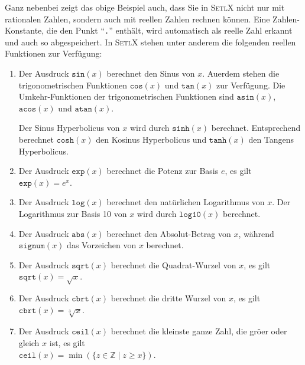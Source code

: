 Ganz nebenbei zeigt das obige Beispiel auch, dass Sie in \textsc{SetlX} nicht
nur mit rationalen Zahlen, sondern auch mit reellen Zahlen rechnen k\"{o}nnen.  Eine Zahlen-Konstante,
die den Punkt ``\texttt{.}'' enth\"{a}lt, wird automatisch als reelle Zahl erkannt
und auch so abgespeichert.  In \textsc{SetlX} stehen unter anderem die folgenden reellen
Funktionen zur Verf\"{u}gung: 
\begin{enumerate}
\item Der Ausdruck $\texttt{sin}(x)$ berechnet den Sinus von $x$.
      Au\3erdem stehen die trigonometrischen Funktionen $\texttt{cos}(x)$ und 
      $\texttt{tan}(x)$ zur Verf\"{u}gung. Die Umkehr-Funktionen der trigonometrischen Funktionen sind
      $\texttt{asin}(x)$, $\texttt{acos}(x)$ und $\texttt{atan}(x)$.    

      Der Sinus Hyperbolicus von $x$ wird durch $\mathtt{sinh}(x)$ berechnet. 
      Entsprechend berechnet $\mathtt{cosh}(x)$ den Kosinus Hyperbolicus und
      $\mathtt{tanh}(x)$ den Tangens Hyperbolicus.
\item Der Ausdruck $\texttt{exp}(x)$ berechnet die Potenz zur Basis $e$, es gilt
      \\[0.2cm]
      \hspace*{1.3cm}
      $\texttt{exp}(x) = e^x$.
\item Der Ausdruck $\texttt{log}(x)$ berechnet den nat\"{u}rlichen Logarithmus von $x$.
       Der Logarithmus zur Basis 10 von $x$ wird durch $\mathtt{log10}(x)$ berechnet.
\item Der Ausdruck $\texttt{abs}(x)$ berechnet den Absolut-Betrag von $x$, w\"{a}hrend
      $\mathtt{signum}(x)$ das Vorzeichen von $x$ berechnet.
\item Der Ausdruck $\texttt{sqrt}(x)$ berechnet die Quadrat-Wurzel von $x$, es gilt
      \\[0.2cm]
      \hspace*{1.3cm}
      $\texttt{sqrt}(x) = \sqrt{x}$.
\item Der Ausdruck $\texttt{cbrt}(x)$ berechnet die dritte Wurzel von $x$, es gilt
      \\[0.2cm]
      \hspace*{1.3cm}
      $\texttt{cbrt}(x) = \sqrt[3]{x}$.
\item Der Ausdruck $\texttt{ceil}(x)$ berechnet die kleinste ganze Zahl, die gr\"{o}\3er oder
      gleich $x$ ist, es gilt
      \\[0.2cm]
      \hspace*{1.3cm}
      $\texttt{ceil}(x) = \min(\{ z \in \mathbb{Z} \mid z \geq x \})$.

\end{enumerate}
